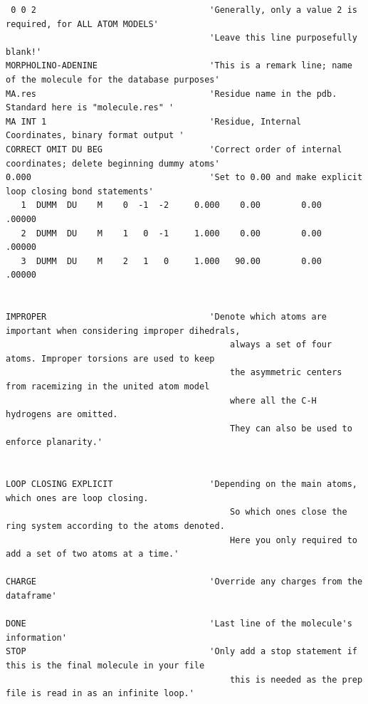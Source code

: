 \documentclass[a4paper]{article}
\begin{document}
\begin{tcolorbox}
\begin{verbatim}
 0 0 2                                  'Generally, only a value 2 is required, for ALL ATOM MODELS'
                                        'Leave this line purposefully blank!'
MORPHOLINO-ADENINE                      'This is a remark line; name of the molecule for the database purposes'
MA.res                                  'Residue name in the pdb. Standard here is "molecule.res" '
MA INT 1                                'Residue, Internal Coordinates, binary format output '
CORRECT OMIT DU BEG                     'Correct order of internal coordinates; delete beginning dummy atoms'
0.000                                   'Set to 0.00 and make explicit loop closing bond statements'
   1  DUMM  DU    M    0  -1  -2     0.000    0.00        0.00    .00000
   2  DUMM  DU    M    1   0  -1     1.000    0.00        0.00    .00000
   3  DUMM  DU    M    2   1   0     1.000   90.00        0.00    .00000


IMPROPER                                'Denote which atoms are important when considering improper dihedrals,
                                            always a set of four atoms. Improper torsions are used to keep
                                            the asymmetric centers from racemizing in the united atom model
                                            where all the C-H hydrogens are omitted.
                                            They can also be used to enforce planarity.'


LOOP CLOSING EXPLICIT                   'Depending on the main atoms, which ones are loop closing.
                                            So which ones close the ring system according to the atoms denoted.
                                            Here you only required to add a set of two atoms at a time.'

CHARGE                                  'Override any charges from the dataframe'

DONE                                    'Last line of the molecule's information'
STOP                                    'Only add a stop statement if this is the final molecule in your file
                                            this is needed as the prep file is read in as an infinite loop.'
\end{verbatim}
\end{tcolorbox}
\footnotesize
\end{document}
